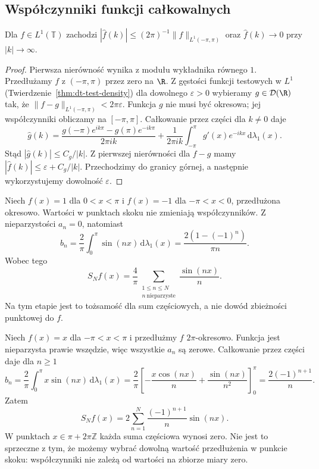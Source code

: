 \subsection{Współczynniki funkcji całkowalnych}

\begin{twierdzenie}
\label{thm:dt-series-riemann-lebesgue}
Dla $f\in L^1(\mathbb T)$ zachodzi
$|\widehat f(k)|\le (2\pi)^{-1}\|f\|_{L^1(-\pi,\pi)}$
oraz $\widehat f(k)\to0$ przy $|k|\to\infty$.
\end{twierdzenie}
\begin{proof}
Pierwsza nierówność wynika z modułu wykładnika
równego $1$. Przedłużamy $f$ z $(-\pi,\pi)$ przez
zero na $\R$. Z gęstości funkcji testowych w $L^1$
(Twierdzenie~\ref{thm:dt-test-density}) dla
dowolnego $\varepsilon>0$ wybieramy
$g\in\mathcal D(\R)$ tak, że
$\|f-g\|_{L^1(-\pi,\pi)}<2\pi\varepsilon$.
Funkcja $g$ nie musi być okresowa; jej współczynniki
obliczamy na $[-\pi,\pi]$. Całkowanie przez części
dla $k\ne0$ daje
\[
 \widehat g(k)=
 \frac{g(-\pi)e^{ik\pi}-g(\pi)e^{-ik\pi}}{2\pi ik}
 +\frac1{2\pi ik}\int_{-\pi}^{\pi}g'(x)e^{-ikx}
 \,\mathrm d\lambda_1(x).
\]
Stąd $|\widehat g(k)|\le C_g/|k|$. Z pierwszej
nierówności dla $f-g$ mamy
$|\widehat f(k)|\le\varepsilon+C_g/|k|$.
Przechodzimy do granicy górnej, a następnie
wykorzystujemy dowolność $\varepsilon$.
\end{proof}

\begin{przyklad}
\label{ex:dt-series-square-wave}
Niech $f(x)=1$ dla $0<x<\pi$ i $f(x)=-1$
dla $-\pi<x<0$, przedłużona okresowo.
Wartości w punktach skoku nie zmieniają
współczynników. Z nieparzystości $a_n=0$, natomiast
\[
 b_n=\frac2\pi\int_0^\pi\sin(nx)\,\mathrm d\lambda_1(x)
 =\frac{2(1-(-1)^n)}{\pi n}.
\]
Wobec tego
\[
 S_Nf(x)=\frac4\pi
 \sum_{\substack{1\le n\le N\\ n\ \mathrm{nieparzyste}}}
 \frac{\sin(nx)}{n}.
\]
Na tym etapie jest to tożsamość dla sum częściowych,
a nie dowód zbieżności punktowej do $f$.
\end{przyklad}

\begin{przyklad}
\label{ex:dt-series-sawtooth}
Niech $f(x)=x$ dla $-\pi<x<\pi$ i przedłużmy $f$
$2\pi$-okresowo. Funkcja jest nieparzysta prawie
wszędzie, więc wszystkie $a_n$ są zerowe.
Całkowanie przez części daje dla $n\ge1$
\[
 b_n=\frac2\pi\int_0^\pi x\sin(nx)\,\mathrm d\lambda_1(x)
 =\frac2\pi\left[
 -\frac{x\cos(nx)}n+\frac{\sin(nx)}{n^2}
 \right]_0^\pi
 =\frac{2(-1)^{n+1}}n.
\]
Zatem
\[
 S_Nf(x)=2\sum_{n=1}^N\frac{(-1)^{n+1}}n\sin(nx).
\]
W punktach $x\in\pi+2\pi\mathbb Z$ każda suma
częściowa wynosi zero. Nie jest to sprzeczne z tym,
że możemy wybrać dowolną wartość przedłużenia
w punkcie skoku: współczynniki nie zależą od
wartości na zbiorze miary zero.
\end{przyklad}

